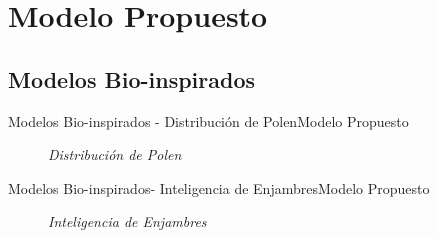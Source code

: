 \section{Modelo Propuesto}
\subsection{Modelos Bio-inspirados}
\begin{frame}{Modelos Bio-inspirados - Distribución de Polen}{Modelo Propuesto}
    \begin{figure}				
		\caption{\small \sl Distribución de Polen \cite{pollen}}
		\label{figure:Pollen}
    \end{figure}
\end{frame}
\begin{frame}{Modelos Bio-inspirados- Inteligencia de Enjambres}{Modelo Propuesto}
    \begin{figure}				
		\caption{\small \sl Inteligencia de Enjambres\cite{chanPSO}}
		\label{figure:Swarm}
    \end{figure}
\end{frame}
